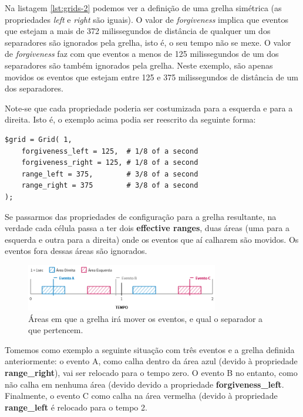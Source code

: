 Na listagem \ref{lst:grids-2} podemos ver a definição de uma grelha simétrica (as propriedades \textit{left} e \textit{right} são iguais). O valor de \textit{forgiveness} implica que eventos que estejam a mais de 372 milissegundos de distância de qualquer um dos separadores são ignorados pela grelha, isto é, o seu tempo não se mexe. O valor de \textit{forgiveness} faz com que eventos a menos de 125 milissegundos de um dos separadores são também ignorados pela grelha. Neste exemplo, são apenas movidos os eventos que estejam entre 125 e 375 milissegundos de distância de um dos separadores.

Note-se que cada propriedade poderia ser costumizada para a esquerda e para a direita. Isto é, o exemplo acima podia ser reescrito da seguinte forma:

\begin{lstlisting}[caption={Código alternativo de definição da grelha representada na figura \ref{fig:grids-2}, com as propriedades \textit{left} e \textit{right}},label={lst:grids-3}]
$grid = Grid( 1,
    forgiveness_left = 125,  # 1/8 of a second
    forgiveness_right = 125, # 1/8 of a second
    range_left = 375,        # 3/8 of a second
    range_right = 375        # 3/8 of a second
);
\end{lstlisting}

Se passarmos das propriedades de configuração para a grelha resultante, na verdade cada célula passa a ter dois \textbf{effective ranges}, duas áreas (uma para a esquerda e outra para a direita) onde os eventos que aí calharem são movidos. Os eventos fora dessas áreas são ignorados.

\begin{figure}[h]
\begin{center}
    \includegraphics[width=0.75\textwidth]{img/grids_3_1.png}
\end{center}
\vspace*{-5mm}
\caption{Áreas em que a grelha irá mover os eventos, e qual o separador a que pertencem.}
\label{fig:grids-3-1}
\end{figure}

Tomemos como exemplo a seguinte situação com três eventos e a grelha definida anteriormente: o evento A, como calha dentro da área azul (devido à propriedade \textbf{range\_right}), vai ser relocado para o tempo zero. O evento B no entanto, como não calha em nenhuma área (devido devido a propriedade \textbf{forgiveness\_left}. Finalmente, o evento C como calha na área vermelha (devido à propriedade \textbf{range\_left} é relocado para o tempo 2.

